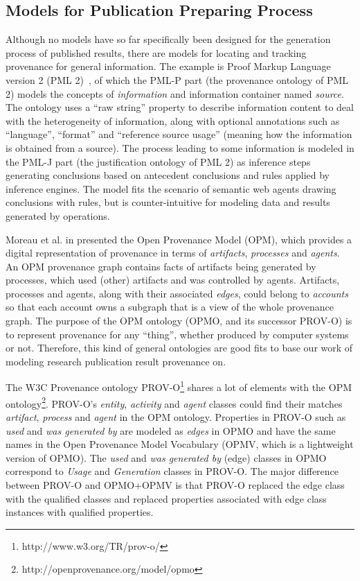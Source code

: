 

\subsection{Models for Publication Preparing Process}
Although no models have so far specifically been designed for the generation process of published results, there are models for locating and tracking provenance for general information. The example is Proof Markup Language version 2 (PML 2)~\cite{mcguinness2007pml}, of which the PML-P part (the provenance ontology of PML 2) models the concepts of \emph{information} and information container named \emph{source}. The ontology uses a ``raw string'' property to describe information content to deal with the heterogeneity of information, along with optional annotations such as ``language'', ``format'' and ``reference source usage'' (meaning how the information is obtained from a source). The process leading to some information is modeled in the PML-J part (the justification ontology of PML 2) as inference steps generating conclusions based on antecedent conclusions and rules applied by inference engines. The model fits the scenario of semantic web agents drawing conclusions with rules, but is counter-intuitive for modeling data and results generated by operations.

Moreau et al. in \cite{moreau2011open} presented the Open Provenance Model (OPM), which provides a digital representation of provenance in terms of \emph{artifacts}, \emph{processes} and \emph{agents}. An OPM provenance graph contains facts of artifacts being generated by processes, which used (other) artifacts and was controlled by agents. Artifacts, processes and agents, along with their associated \emph{edges}, could belong to \emph{accounts} so that each account owns a subgraph that is a view of the whole provenance graph. The purpose of the OPM ontology (OPMO, and its successor PROV-O) is to represent provenance for any ``thing'', whether produced by computer systems or not. Therefore, this kind of general ontologies are good fits to base our work of modeling research publication result provenance on.

The W3C Provenance ontology PROV-O\footnote{http://www.w3.org/TR/prov-o/} shares a lot of elements with the OPM ontology\footnote{http://openprovenance.org/model/opmo}. PROV-O's \emph{entity}, \emph{activity} and \emph{agent} classes could find their matches \emph{artifact}, \emph{process} and \emph{agent} in the OPM ontology. Properties in PROV-O such as \emph{used} and \emph{was generated by} are modeled as \emph{edges} in OPMO and have the same names in the Open Provenance Model Vocabulary (OPMV, which is a lightweight version of OPMO). The \emph{used} and \emph{was generated by} (edge) classes in OPMO correspond to \emph{Usage} and \emph{Generation} classes in PROV-O. The major difference between PROV-O and OPMO+OPMV is that PROV-O replaced the edge class with the qualified classes and replaced properties associated with edge class instances with qualified properties. 

